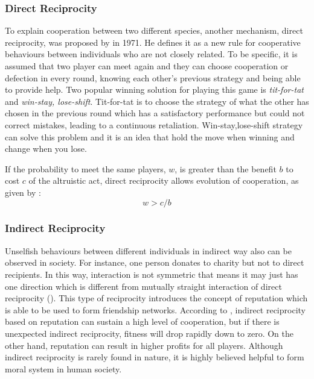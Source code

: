 \subsubsection{Direct Reciprocity}
To explain cooperation between two different species, another mechanism, direct reciprocity, was proposed by \citet{trivers1971evolution} in 1971. He defines it as a new rule for cooperative behaviours between individuals who are not closely related. To be specific, it is assumed that two player can meet again and they can choose cooperation or defection in every round, knowing each other's previous strategy and being able to provide help. Two popular winning solution for playing this game is \textit{tit-for-tat} and \textit{win-stay, lose-shift}. Tit-for-tat is to choose the strategy of what the other has chosen in the previous round which has a satisfactory performance but could not correct mistakes, leading to a continuous retaliation. Win-stay,lose-shift strategy can solve this problem and it is an idea that hold the move when winning and change when you lose. 

If the probability to meet the same players, $w$, is greater than the benefit $b$ to cost $c$ of the altruistic act, direct reciprocity allows evolution of cooperation, as given by :
\begin{equation}\label{eq:2.3}
    w > c/b
\end{equation}
\subsubsection{Indirect Reciprocity}
Unselfish behaviours between different individuals in indirect way also can be observed in society. For instance, one person donates to charity but not to direct recipients. In this way, interaction is not symmetric that means it may just has one direction which is different from mutually straight interaction of direct reciprocity (). This type of reciprocity introduces the concept of reputation which is able to be used to form friendship networks. According to \citet{milinski2002reputation}, indirect reciprocity based on reputation can sustain a high level of cooperation, but if there is unexpected indirect reciprocity, fitness will drop rapidly down to zero. On the other hand, reputation can result in higher profits for all players. Although indirect reciprocity is rarely found in nature, it is highly believed helpful to form moral system in human society.

